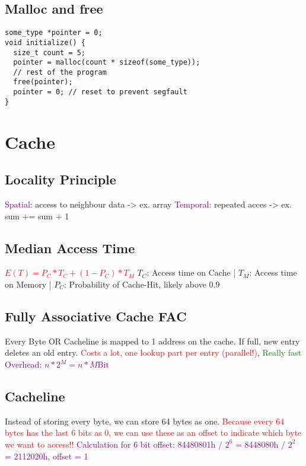 \documentclass[main.tex,fontsize=8pt,paper=a4,paper=landscape,DIV=calc,]{scrartcl}
\begin{document}
\begin{multicols*}{4}
\subsection{Malloc and free}
\vspace{-2.5mm}
\begin{lstlisting}
some_type *pointer = 0;
void initialize() {
  size_t count = 5;
  pointer = malloc(count * sizeof(some_type));
  // rest of the program 
  free(pointer);
  pointer = 0; // reset to prevent segfault
}
\end{lstlisting}
\vspace{2mm}

\section{Cache}

\subsection{Locality Principle}
\textcolor{purple}{Spatial}: access to neighbour data -> ex. array\newline
\textcolor{purple}{Temporal}: repeated acces -> ex. sum += sum + 1

\subsection{Median Access Time}
\textcolor{red}{\(E(T) = P_C * T_C + (1 - P_C )* T_M\)}\newline
\(T_C\): Access time on Cache |
\(T_M\): Access time on Memory |
\(P_C\): Probability of Cache-Hit, likely above 0.9

\subsection{Fully Associative Cache FAC}
Every Byte OR Cacheline is mapped to 1 address on the cache. If full, new entry deletes an old entry.
\textcolor{red}{Costs a lot, one lookup part per entry (parallel!)}, \textcolor{green}{Really fast}\newline
\textcolor{purple}{Overhead: \(n * 2^M = n * M \text{Bit}\)}

\subsection{Cacheline}
Instead of storing every byte, we can store 64 bytes as one. \textcolor{red}{Because every 64 bytes has the last 6 bits as 0, we can use these as an offset to indicate which byte we want to access!!}
\textcolor{purple}{Calculation for 6 bit offset: 84480801h / \(2^6\) = 8448080h / \(2^2\) = 2112020h, offset = 1 }


\end{multicols*}
\end{document}
